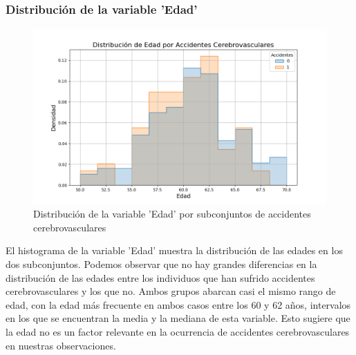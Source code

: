 \documentclass[a4paper, 12pt]{article}
\begin{document}
\subsubsection{Distribución de la variable 'Edad'}
\begin{figure}[H]
    \centering
    \includegraphics[width=1\textwidth]{img/Histogramas/distribucion_Edad_por_Accidentes.png}
    \caption{Distribución de la variable 'Edad' por subconjuntos de accidentes cerebrovasculares}
\end{figure}

El histograma de la variable 'Edad' muestra la distribución de las edades en los dos subconjuntos. Podemos observar que no hay grandes diferencias en la distribución de las edades entre los individuos que han sufrido accidentes cerebrovasculares y los que no. Ambos grupos abarcan casi el mismo rango de edad, con la edad más frecuente en ambos casos entre los 60 y 62 años, intervalos en los que se encuentran la media y la mediana de esta variable. Esto sugiere que la edad no es un factor relevante en la ocurrencia de accidentes cerebrovasculares en nuestras observaciones.
\end{document}

